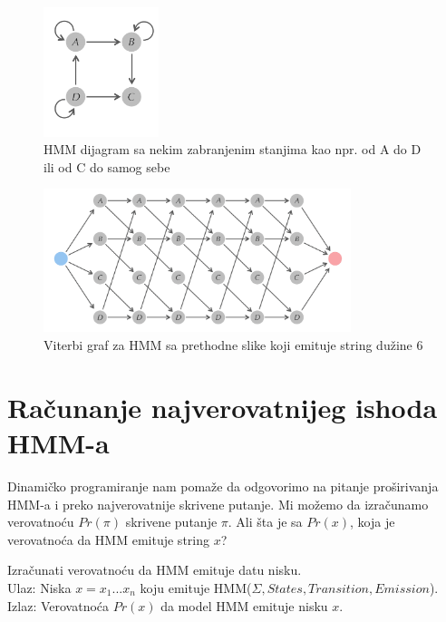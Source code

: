 \begin{figure}[H]
\centering
\includegraphics[width=0.3\textwidth]{poglavlja/10/slike/brzina_Viterbi_1.png}
\caption{HMM dijagram sa nekim zabranjenim stanjima kao npr. od A do D ili od C do samog sebe}
\label{slika: viterbi_1}
\end{figure}

\begin{figure}[H]
\centering
\includegraphics[width=0.8\textwidth]{poglavlja/10/slike/brzina_Viterbi_2.png}
\caption{Viterbi graf za HMM sa prethodne slike koji emituje string dužine 6}
\label{slika: viterbi_2}
\end{figure}

\section{Računanje najverovatnijeg ishoda HMM-a}

Dinamičko programiranje nam pomaže da odgovorimo na pitanje proširivanja HMM-a i preko najverovatnije skrivene putanje. Mi možemo da izračunamo verovatnoću $ Pr(\pi) $ skrivene putanje $ \pi $. Ali šta je sa $ Pr(x) $, koja je verovatnoća da HMM emituje string $ x $?

\begin{problem}
    Izračunati verovatnoću da HMM emituje datu nisku.\\
    Ulaz: Niska $ x = x_1 . . . x_n $ koju emituje HMM($ \Sigma, States, Transition, Emission $).\\ 
    Izlaz: Verovatnoća $ Pr(x) $ da model HMM emituje nisku $ x $.    
\end{problem}

